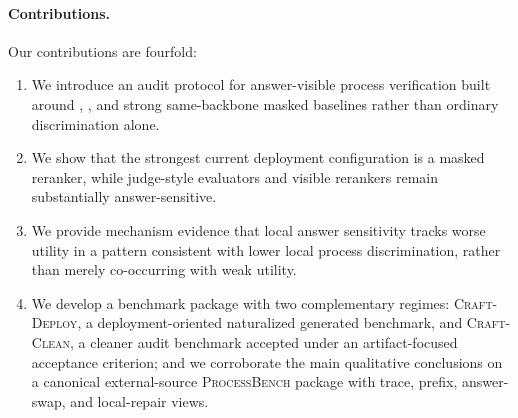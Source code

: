 \paragraph{Contributions.}
Our contributions are fourfold:
\begin{enumerate}[leftmargin=1.5em]
\item We introduce an audit protocol for answer-visible process verification
built around \amcd, \ass, and strong same-backbone masked baselines rather than
ordinary discrimination alone.
\item We show that the strongest current deployment configuration is a masked
reranker, while judge-style evaluators and visible rerankers remain
substantially answer-sensitive.
\item We provide mechanism evidence that local answer sensitivity tracks worse
utility in a pattern consistent with lower local process discrimination,
rather than merely co-occurring with weak utility.
\item We develop a benchmark package with two complementary regimes:
\textsc{Craft-Deploy}, a deployment-oriented naturalized generated benchmark,
and \textsc{Craft-Clean}, a cleaner audit benchmark accepted under an
artifact-focused acceptance criterion; and we corroborate the main qualitative
conclusions on a canonical external-source \textsc{ProcessBench} package with
trace, prefix, answer-swap, and local-repair views.
\end{enumerate}

